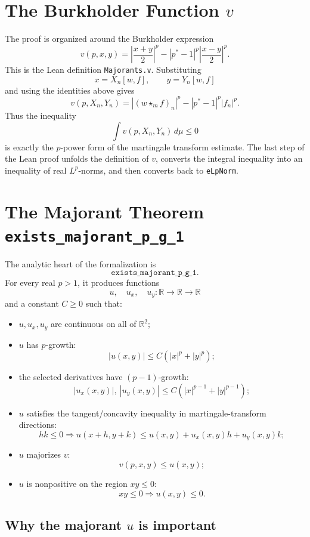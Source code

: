 \documentclass[11pt]{amsart}
\newcommand{\R}{\mathbb{R}}
\begin{document}
\section{The Burkholder Function \(v\)}

The proof is organized around the Burkholder expression
\[
  v(p,x,y)
    =
      \left|\frac{x+y}{2}\right|^p
      -
      |p^\ast-1|^p
      \left|\frac{x-y}{2}\right|^p.
\]
This is the Lean definition \texttt{Majorants.v}.  Substituting
\[
  x = X_n[w,f], \qquad y = Y_n[w,f]
\]
and using the identities above gives
\[
  v(p,X_n,Y_n)
    =
      |(w\star_m f)_n|^p
      -
      |p^\ast-1|^p |f_n|^p.
\]
Thus the inequality
\[
  \int v(p,X_n,Y_n)\,d\mu \le 0
\]
is exactly the \(p\)-power form of the martingale transform estimate.
The last step of the Lean proof unfolds the definition of \(v\), converts the
integral inequality into an inequality of real \(L^p\)-norms, and then converts
back to \texttt{eLpNorm}.

\section{The Majorant Theorem \texttt{exists\_majorant\_p\_g\_1}}

The analytic heart of the formalization is
\[
  \texttt{exists\_majorant\_p\_g\_1}.
\]
For every real \(p>1\), it produces functions
\[
  u,\quad u_x,\quad u_y : \R \to \R \to \R
\]
and a constant \(C\ge 0\) such that:

\begin{itemize}
  \item \(u,u_x,u_y\) are continuous on all of \(\R^2\);
  \item \(u\) has \(p\)-growth:
    \[
      |u(x,y)| \le C(|x|^p+|y|^p);
    \]
  \item the selected derivatives have \((p-1)\)-growth:
    \[
      |u_x(x,y)|,\ |u_y(x,y)|
        \le C(|x|^{p-1}+|y|^{p-1});
    \]
  \item \(u\) satisfies the tangent/concavity inequality in martingale-transform
    directions:
    \[
      hk\le 0
      \Longrightarrow
      u(x+h,y+k)
        \le u(x,y)+u_x(x,y)h+u_y(x,y)k;
    \]
  \item \(u\) majorizes \(v\):
    \[
      v(p,x,y)\le u(x,y);
    \]
  \item \(u\) is nonpositive on the region \(xy\le 0\):
    \[
      xy\le 0 \Longrightarrow u(x,y)\le 0.
    \]
\end{itemize}

\subsection{Why the majorant \(u\) is important}
\end{document}
